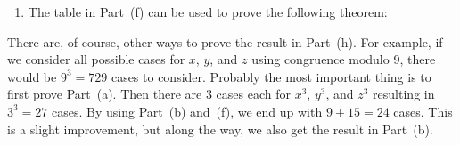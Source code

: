 \begin{enumerate}
\begin{enumerate}
\item The table in Part~(f) can be used to prove the following theorem:

\end{enumerate}
\note There are, of course, other ways to prove the result in Part~(h).  For example, if we consider all possible cases for $x$, $y$, and $z$ using congruence modulo 9, there would be $9^3 = 729$ cases to consider.  Probably the most important thing is to first prove Part~(a).  Then there are 3 cases each for $x^3$, $y^3$, and $z^3$ resulting in $3^3 = 27$ cases.  By using Part~(b) and~(f), we end up with $9+15 = 24$ cases.  This is a slight improvement, but along the way, we also get the result in Part~(b).
\end{enumerate}
\hbreak
\endinput







